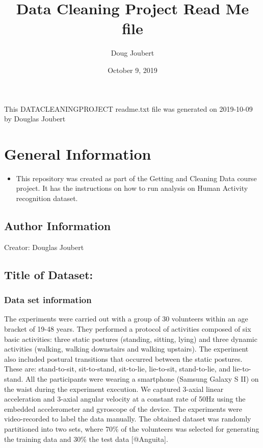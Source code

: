 \documentclass[]{article}
\title{Data Cleaning Project Read Me file}
\author{Doug Joubert}
\date{October 9, 2019}
\providecommand{\tightlist}{%
  \setlength{\itemsep}{0pt}\setlength{\parskip}{0pt}}
\begin{document}
\maketitle

{
\setcounter{tocdepth}{2}
\tableofcontents
}
This DATACLEANINGPROJECT readme.txt file was generated on 2019-10-09 by
Douglas Joubert

\section{General Information}\label{general-information}

\begin{itemize}
\tightlist
\item
  This repository was created as part of the Getting and Cleaning Data
  course project. It has the instructions on how to run analysis on
  Human Activity recognition dataset.
\end{itemize}

\subsection{Author Information}\label{author-information}

Creator: Douglas Joubert

\subsection{Title of Dataset:}\label{title-of-dataset}

\subsubsection{Data set information}\label{data-set-information}

The experiments were carried out with a group of 30 volunteers within an
age bracket of 19-48 years. They performed a protocol of activities
composed of six basic activities: three static postures (standing,
sitting, lying) and three dynamic activities (walking, walking
downstairs and walking upstairs). The experiment also included postural
transitions that occurred between the static postures. These are:
stand-to-sit, sit-to-stand, sit-to-lie, lie-to-sit, stand-to-lie, and
lie-to-stand. All the participants were wearing a smartphone (Samsung
Galaxy S II) on the waist during the experiment execution. We captured
3-axial linear acceleration and 3-axial angular velocity at a constant
rate of 50Hz using the embedded accelerometer and gyroscope of the
device. The experiments were video-recorded to label the data manually.
The obtained dataset was randomly partitioned into two sets, where 70\%
of the volunteers was selected for generating the training data and 30\%
the test data {[}@Anguita{]}.
\end{document}
